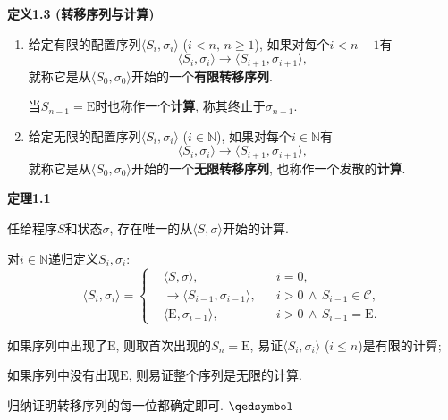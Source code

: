\documentclass[UTF8]{ctexart}
\begin{document}
\vspace{10pt}

\hypertarget{sec:定义1.3}{}
\noindent\textbf{定义1.3 (转移序列与计算)}

\begin{enumerate}
    \item 给定有限的配置序列$\langle S_i,\sigma_i\rangle$ ($i<n,\,n\geqslant 1$),
    如果对每个$i<n-1$有
    \[
        \langle S_i,\sigma_i\rangle\to\langle S_{i+1},\sigma_{i+1}\rangle,
    \]
    就称它是从$\langle S_0,\sigma_0\rangle$开始的一个\textbf{有限转移序列}.

    \hspace{2.17em}
    当$S_{n-1}=\mathrm{E}$时也称作一个\textbf{计算},
    称其终止于$\sigma_{n-1}$.

    \item 给定无限的配置序列$\langle S_i,\sigma_i\rangle$ ($i\in\mathbb{N}$),
    如果对每个$i\in\mathbb{N}$有
    \[
        \langle S_i,\sigma_i\rangle\to\langle S_{i+1},\sigma_{i+1}\rangle,
    \]
    就称它是从$\langle S_0,\sigma_0\rangle$开始的一个\textbf{无限转移序列},
    也称作一个发散的\textbf{计算}.
\end{enumerate}

\vspace{10pt}

\hypertarget{sec:定理1.1}{}
\noindent\textbf{定理1.1}

任给程序$S$和状态$\sigma$, 存在唯一的从$\langle S,\sigma\rangle$开始的计算.



对$i\in\mathbb{N}$递归定义$S_i,\sigma_i$:
\[\langle S_i,\sigma_i\rangle=\left\{\begin{aligned}
    &\langle S,\sigma\rangle,&&i=0,\\
    &\to\langle S_{i-1},\sigma_{i-1}\rangle,&&i>0\,\land\,S_{i-1}\in\mathcal{C},\\
    &\langle\mathrm{E},\sigma_{i-1}\rangle,&&i>0\,\land\,S_{i-1}=\mathrm{E}.
\end{aligned}\right.\]

\vspace{3pt}
如果序列中出现了$\mathrm{E}$, 则取首次出现的$S_n=\mathrm{E}$,
易证$\langle S_i,\sigma_i\rangle$ ($i\leqslant n$)是有限的计算;

如果序列中没有出现$\mathrm{E}$, 则易证整个序列是无限的计算.


归纳证明转移序列的每一位都确定即可. \hfill $\qedsymbol$
\end{document}
